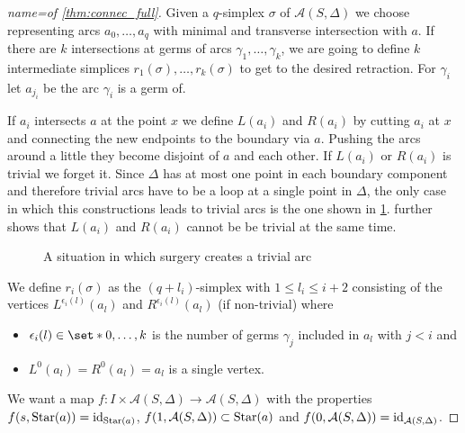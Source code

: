 \begin{proof}[{name={of \autoref{thm:connec_full}}}]
	Given a $q$-simplex $\sigma$ of $\mathcal{A}(S,\Delta)$ we choose representing arcs $a_0, \ldots ,a_q$ with minimal and transverse intersection with $a$.
	If there are $k$ intersections at germs of arcs $\gamma_1, \ldots ,\gamma_k$, we are going to define $k$ intermediate simplices $r_1(\sigma), \ldots ,r_k(\sigma)$ to get to the desired retraction.
	For $\gamma_i$ let $a_{j_i}$ be the arc $\gamma_i$ is a germ of.

	If $a_i$ intersects $a$ at the point $x$ we define $L(a_i)$ and $R(a_i)$ by cutting $a_i$ at $x$ and connecting the new endpoints to the boundary via $a$.
	Pushing the arcs around a little they become disjoint of $a$ and each other.
	If $L(a_i)$ or $R(a_i)$ is trivial we forget it.
	Since $\Delta$ has at most one point in each boundary component and therefore trivial arcs have to be a loop at a single point in $\Delta$, the only case in which this constructions leads to trivial arcs is the one shown in \cref{fig:surg_trivial}.
	 further shows that $L(a_i)$ and $R(a_i)$ cannot be be trivial at the same time.
	\begin{figure}[hbt]
		\centering
		\caption{A situation in which surgery creates a trivial arc}\label{fig:surg_trivial}
	\end{figure}
	
	We define $r_i(\sigma)$ as the $(q+ l_i)$-simplex with $1 \le l_i \le i + 2$ consisting of the vertices $L^{\epsilon_i(l)}(a_l)$ and $R^{\epsilon_i(l)}(a_l)$ (if non-trivial)  where 
	\begin{itemize}
		\item $\epsilon_i(l) \in \set*{0, \ldots ,k}$ is the number of germs $\gamma_j$ included in $a_l$ with $j < i$ and
		\item $L^0(a_l)=R^0(a_l)=a_l$ is a single vertex.
	\end{itemize}
	We want a map $f \colon I \times \mathcal{A}(S,\Delta) \to \mathcal{A}(S,\Delta)$ with the properties $f(s,\operatorname{Star}(a)) = \operatorname{id}_{\operatorname{Star}(a)}$, $f(1,\mathcal{A}(S,\Delta)) \subset \operatorname{Star}(a)$ and $f(0,\mathcal{A}(S,\Delta)) = \operatorname{id}_{\mathcal{A}(S,\Delta)}$.
	
\end{proof}

